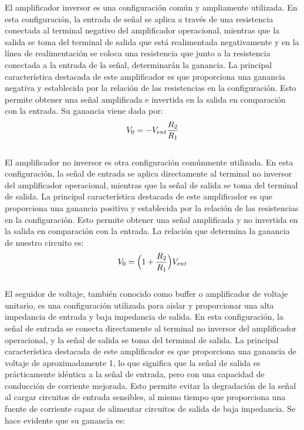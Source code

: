 \documentclass[12pt]{article}
\begin{document}
	El amplificador inversor es una configuración común y ampliamente utilizada. En esta configuración, la entrada de señal se aplica a través de una resistencia conectada al terminal negativo del amplificador operacional, mientras que la salida se toma del terminal de salida que está realimentada negativamente y en la línea de realimentación se coloca una resistencia que junto a la resistencia conectada a la entrada de la señal, determinarán la ganancia. La principal característica destacada de este amplificador es que proporciona una ganancia negativa y establecida por la relación de las resistencias en la configuración. Esto permite obtener una señal amplificada e invertida en la salida en comparación con la entrada. Su ganancia viene dada por:\\
	
	\begin{equation}
		\notag V_0 = -V_{ent}\frac{R_2}{R_1}
	\end{equation}\\

	El amplificador no inversor es otra configuración comúnmente utilizada. En esta configuración, la señal de entrada se aplica directamente al terminal no inversor del amplificador operacional, mientras que la señal de salida se toma del terminal de salida. La principal característica destacada de este amplificador es que proporciona una ganancia positiva y establecida por la relación de las resistencias en la configuración. Esto permite obtener una señal amplificada y no invertida en la salida en comparación con la entrada. La relación que determina la ganancia de nuestro circuito es:\\
	
	\begin{equation}
		\notag V_0 = \Big (1 + \frac{R_2}{R_1} \Big) V_{ent}
	\end{equation}\\

	El seguidor de voltaje, también conocido como buffer o amplificador de voltaje unitario, es una configuración utilizada para aislar y proporcionar una alta impedancia de entrada y baja impedancia de salida. En esta configuración, la señal de entrada se conecta directamente al terminal no inversor del amplificador operacional, y la señal de salida se toma del terminal de salida. La principal característica destacada de este amplificador es que proporciona una ganancia de voltaje de aproximadamente 1, lo que significa que la señal de salida es prácticamente idéntica a la señal de entrada, pero con una capacidad de conducción de corriente mejorada. Esto permite evitar la degradación de la señal al cargar circuitos de entrada sensibles, al mismo tiempo que proporciona una fuente de corriente capaz de alimentar circuitos de salida de baja impedancia. Se hace evidente que su ganancia es:\\
	
\end{document}
